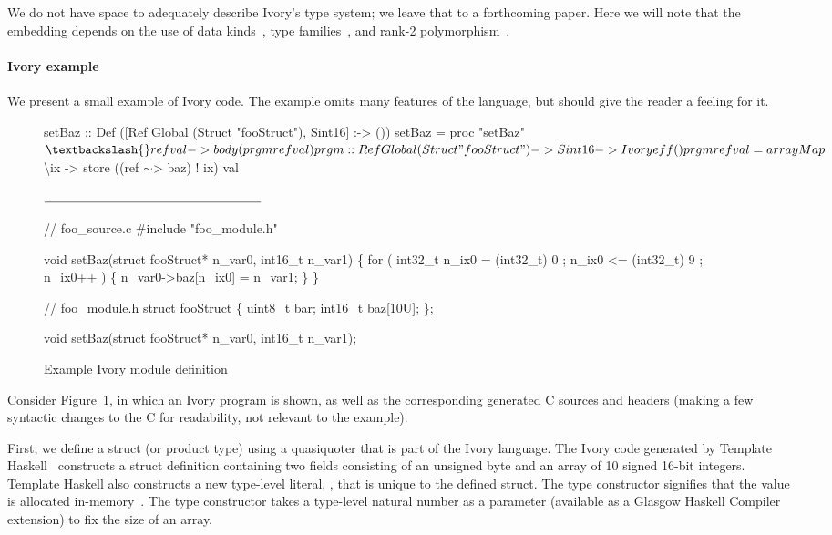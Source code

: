 We do not have space to adequately describe Ivory's type system; we leave that
to a forthcoming paper.  Here we will note that the embedding depends on the use
of data kinds~\cite{datakinds}, type families~\cite{typefamilies}, and rank-2
polymorphism~\cite{stmonad}.

\paragraph{Ivory example}
We present a small example of Ivory code.  The example omits many features of
the language, but should give the reader a feeling for it.

\begin{figure}
    \begin{smcode}

setBaz :: Def ([Ref Global (Struct "fooStruct"), Sint16] :-> ())
setBaz = proc "setBaz" $ \textbackslash{}ref val -> body (prgm ref val)

prgm :: Ref Global (Struct "fooStruct") -> Sint16 -> Ivory eff ()
prgm ref val = arrayMap $ \textbackslash{}ix ->
                 store ((ref \(\sim\)> baz) ! ix) val

\(\noindent\rule{6cm}{0.4pt}\)

// foo_source.c
#include "foo_module.h"

void setBaz(struct fooStruct* n_var0, int16_t n_var1) \{
  for ( int32_t n_ix0 = (int32_t) 0
      ; n_ix0 <= (int32_t) 9
      ; n_ix0++ ) \{
      n_var0->baz[n_ix0] = n_var1;
  \}
\}

// foo_module.h
struct fooStruct \{
    uint8_t bar;
    int16_t baz[10U];
\};

void setBaz(struct fooStruct* n_var0, int16_t n_var1);
\end{smcode}
  \caption{Example Ivory module definition}
  \label{fig:module}
\end{figure}

Consider Figure~\ref{fig:module}, in which an Ivory program is shown, as well as
the corresponding generated C sources and headers (making a few syntactic
changes to the C for readability, not relevant to the example).

First, we define a struct (or product type) using a quasiquoter that is part of
the Ivory language.  The Ivory code generated by Template
Haskell~\cite{th} constructs a struct definition containing two fields
consisting of an unsigned byte and an array of 10 signed 16-bit integers.
Template Haskell also constructs a new type-level literal, ,
that is unique to the defined struct.  The  type constructor
signifies that the value is allocated in-memory~\cite{memareas}.  The 
type constructor takes a type-level natural number as a parameter (available as
a Glasgow Haskell Compiler extension) to fix the size of an array.

